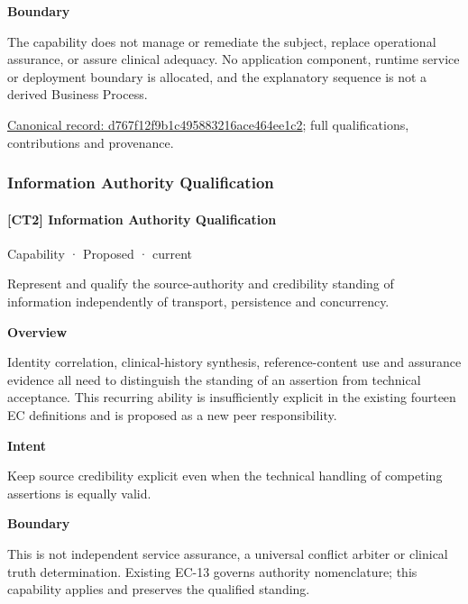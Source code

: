 \textbf{Boundary}



The capability does not manage or remediate the subject, replace operational assurance, or assure clinical adequacy. No application component, runtime service or deployment boundary is allocated, and the explanatory sequence is not a derived Business Process.


{\footnotesize \href{../../../../continuum/strategy/capability/d767f12f9b1c495883216ace464ee1c2.md}{Canonical record: d767f12f9b1c495883216ace464ee1c2}; full qualifications, contributions and provenance.}\par
\subsubsection{Information Authority Qualification}

\paragraph{[CT2] Information Authority Qualification}

\label{element:cbba9984dd404deabed41fdcc96088b1}
{\small Capability · Proposed · current}\par

Represent and qualify the source-authority and credibility standing of information independently of transport, persistence and concurrency.



\textbf{Overview}



Identity correlation, clinical-history synthesis, reference-content use and assurance evidence all need to distinguish the standing of an assertion from technical acceptance. This recurring ability is insufficiently explicit in the existing fourteen EC definitions and is proposed as a new peer responsibility.



\textbf{Intent}



Keep source credibility explicit even when the technical handling of competing assertions is equally valid.



\textbf{Boundary}



This is not independent service assurance, a universal conflict arbiter or clinical truth determination. Existing EC-13 governs authority nomenclature; this capability applies and preserves the qualified standing.


